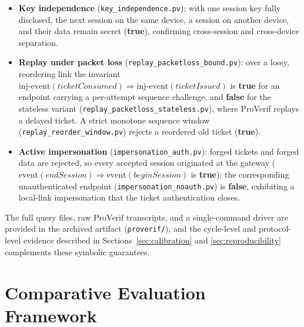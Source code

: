 \documentclass[journal]{IEEEtran}
\begin{document}
\begin{itemize}
        stored.
  \item \textbf{Key independence} (\texttt{key\_independence.pv}): with one
        session key fully disclosed, the next session on the same device, a
        session on another device, and their data remain secret (\textbf{true}),
        confirming cross-session and cross-device separation.
  \item \textbf{Replay under packet loss} (\texttt{replay\_packetloss\_bound.pv}):
        over a lossy, reordering link the invariant
        $\mathrm{inj\text{-}event}(\mathit{ticketConsumed}) \Longrightarrow
        \mathrm{inj\text{-}event}(\mathit{ticketIssued})$ is \textbf{true} for an
        endpoint carrying a per-attempt sequence challenge, and \textbf{false}
        for the stateless variant (\texttt{replay\_packetloss\_stateless.pv}),
        where ProVerif replays a delayed ticket. A strict monotone sequence
        window (\texttt{replay\_reorder\_window.pv}) rejects a reordered old
        ticket (\textbf{true}).
  \item \textbf{Active impersonation} (\texttt{impersonation\_auth.pv}): forged
        tickets and forged data are rejected, so every accepted session
        originated at the gateway
        ($\mathrm{event}(\mathit{endSession}) \Longrightarrow
        \mathrm{event}(\mathit{beginSession})$ is \textbf{true}); the
        corresponding unauthenticated endpoint
        (\texttt{impersonation\_noauth.pv}) is \textbf{false}, exhibiting a
        local-link impersonation that the ticket authentication closes.
\end{itemize}

The full query files, raw ProVerif transcripts, and a single-command driver are
provided in the archived artifact (\texttt{proverif/}), and the cycle-level and
protocol-level evidence described in Sections~\ref{sec:calibration} and
\ref{sec:reproducibility} complements these symbolic guarantees.


\section{Comparative Evaluation Framework}
\end{document}
